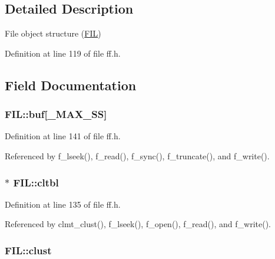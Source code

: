 \subsection{Detailed Description}
File object structure (\hyperlink{structFIL}{F\+IL}) 

Definition at line 119 of file ff.\+h.



\subsection{Field Documentation}
\subsubsection[{\texorpdfstring{buf}{buf}}]{ F\+I\+L\+::buf\mbox{[}{\bf \+\_\+\+M\+A\+X\+\_\+\+SS}\mbox{]}}\hypertarget{structFIL_a7a95fb86588663e48309b5cded7e207b}{}\label{structFIL_a7a95fb86588663e48309b5cded7e207b}


Definition at line 141 of file ff.\+h.



Referenced by f\+\_\+lseek(), f\+\_\+read(), f\+\_\+sync(), f\+\_\+truncate(), and f\+\_\+write().

\subsubsection[{\texorpdfstring{cltbl}{cltbl}}]{$\ast$ F\+I\+L\+::cltbl}\hypertarget{structFIL_a28a30613d48cefcf9efbd334cd861fc8}{}\label{structFIL_a28a30613d48cefcf9efbd334cd861fc8}


Definition at line 135 of file ff.\+h.



Referenced by clmt\+\_\+clust(), f\+\_\+lseek(), f\+\_\+open(), f\+\_\+read(), and f\+\_\+write().

\subsubsection[{\texorpdfstring{clust}{clust}}]{ F\+I\+L\+::clust}\hypertarget{structFIL_aa41312aba551b9a6d1c9d3c8c7d2734b}{}\label{structFIL_aa41312aba551b9a6d1c9d3c8c7d2734b}


